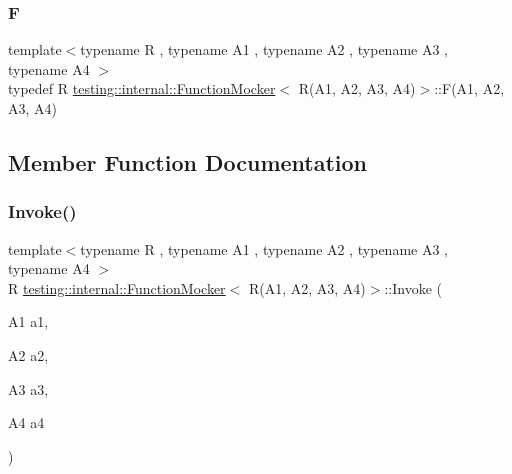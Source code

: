 \mbox{\label{classtesting_1_1internal_1_1_function_mocker_3_01_r_07_a1_00_01_a2_00_01_a3_00_01_a4_08_4_a9be04bb962edb1458c857ca8e9db9318}} 
\subsubsection{\texorpdfstring{F}{F}}
{\footnotesize\ttfamily template$<$typename R , typename A1 , typename A2 , typename A3 , typename A4 $>$ \\
typedef R \mbox{\hyperlink{classtesting_1_1internal_1_1_function_mocker}{testing\+::internal\+::\+Function\+Mocker}}$<$ R(A1, A2, A3, A4)$>$\+::F(A1, A2, A3, A4)}



\subsection{Member Function Documentation}
\mbox{\label{classtesting_1_1internal_1_1_function_mocker_3_01_r_07_a1_00_01_a2_00_01_a3_00_01_a4_08_4_ac20228ed7a21f43775a08fb3b1661721}} 
\subsubsection{\texorpdfstring{Invoke()}{Invoke()}}
{\footnotesize\ttfamily template$<$typename R , typename A1 , typename A2 , typename A3 , typename A4 $>$ \\
R \mbox{\hyperlink{classtesting_1_1internal_1_1_function_mocker}{testing\+::internal\+::\+Function\+Mocker}}$<$ R(A1, A2, A3, A4)$>$\+::Invoke (\begin{DoxyParamCaption}\item[{A1}]{a1,  }\item[{A2}]{a2,  }\item[{A3}]{a3,  }\item[{A4}]{a4 }\end{DoxyParamCaption})\hspace{0.3cm}{\ttfamily [inline]}}


